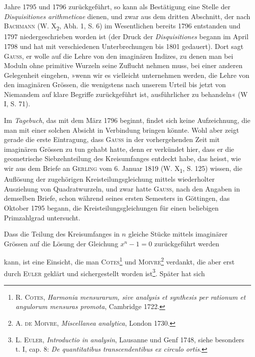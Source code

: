 Jahre 1795 und 1796 zurückgeführt, so kann als Bestätigung eine Stelle der
\textit{Disquisitiones arithmeticae} dienen, und zwar aus dem dritten Abschnitt, der nach
\textsc{Bachmann} (W. X\textsubscript{2}, Abh. 1, S. 6) im Wesentlichen bereits 1796 entstanden und
1797 niedergeschrieben worden ist (der Druck der \textit{Disquisitiones} begann im
April 1798 und hat mit verschiedenen Unterbrechungen bis 1801 gedauert).
Dort sagt \textsc{Gauss}, er wolle auf die Lehre von den imaginären Indizes, zu denen
man bei Moduln ohne primitive Wurzeln seine Zuflucht nehmen muss, bei
einer anderen Gelegenheit eingehen, »wenn wir es vielleicht unternehmen
werden, die Lehre von den imaginären Grössen, die wenigstens nach unserem
Urteil bis jetzt von Niemandem auf klare Begriffe zurückgeführt ist, ausführlicher
zu behandeln« (W I, S. 71).
\par
Im \textit{Tagebuch}, das mit dem März 1796 beginnt, findet sich keine Aufzeichnung,
die man mit einer solchen Absicht in Verbindung bringen könnte.
Wohl aber zeigt gerade die erste Eintragung, dass \textsc{Gauss} in der vorhergehenden
Zeit mit imaginären Grössen zu tun gehabt hatte, denn er verkündet
hier, dass er die geometrische Siebzehnteilung des Kreisumfanges entdeckt
habe, das heisst, wie wir aus dem Briefe an \textsc{Gerling} vom 6. Januar
1819 (W. X\textsubscript{1}, S. 125) wissen, die Auflösung der zugehörigen Kreisteilungsgleichung
mittels wiederholter Ausziehung von Quadratwurzeln, und zwar hatte
\textsc{Gauss}, nach den Angaben in demselben Briefe, schon während seines ersten
Semesters in Göttingen, das Oktober 1795 begann, die Kreisteilungsgleichungen
für einen beliebigen Primzahlgrad untersucht.
\par
Dass die Teilung des Kreisumfanges in \(n\) gleiche Stücke mittels imaginärer
Grössen auf die Lösung der Gleichung \(x^n-1=0\) zurückgeführt werden
\par{}
\clearpage{}\setcounter{footnote}{0}
\noindent kann, ist eine Einsicht, die man \textsc{Cotes}\footnote{R. \textsc{Cotes}, \textit{Harmonia mensurarum, sive analysis et synthesis per rationum et angulorum mensuras promota}, Cambridge 1722.} und \textsc{Moivre}\footnote{A. \textsc{de Moivre}, \textit{Miscellanea analytica}, London 1730.} verdankt, die aber
erst durch \textsc{Euler} geklärt und sichergestellt worden ist\footnote{L. \textsc{Euler}, \textit{Introductio in analysin}, Lausanne und Genf 1748, siehe besonders t. I, cap. 8: \textit{De quantitatibus transcendentibus ex circulo ortis}.}. Später hat sich

